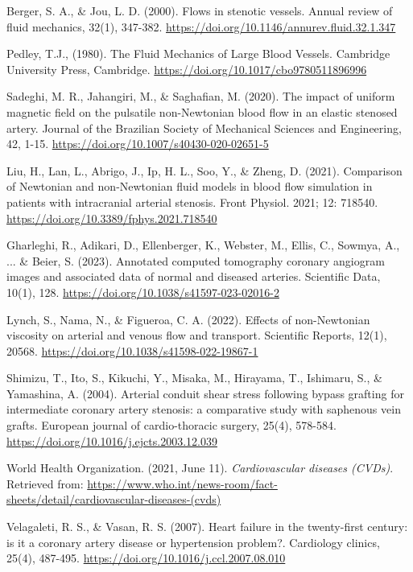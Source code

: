 ﻿\documentclass[12pt,a4paper]{article}
\theoremstyle{definition}
\numberwithin{equation}{section}
\begin{document}
\begin{thebibliography}{}
 Berger, S. A., \& Jou, L. D. (2000). Flows in stenotic vessels. Annual review of fluid mechanics, 32(1), 347-382.  \url{https://doi.org/10.1146/annurev.fluid.32.1.347}

 Pedley, T.J., (1980). The Fluid Mechanics of Large Blood Vessels. Cambridge University Press, Cambridge. \url{https://doi.org/10.1017/cbo9780511896996}

 Sadeghi, M. R., Jahangiri, M., \& Saghafian, M. (2020). The impact of uniform magnetic field on the pulsatile non-Newtonian blood flow in an elastic stenosed artery. Journal of the Brazilian Society of Mechanical Sciences and Engineering, 42, 1-15. \url{https://doi.org/10.1007/s40430-020-02651-5}  

 Liu, H., Lan, L., Abrigo, J., Ip, H. L., Soo, Y., \& Zheng, D. (2021). Comparison of Newtonian and non-Newtonian fluid models in blood flow simulation in patients with intracranial arterial stenosis. Front Physiol. 2021; 12: 718540. \url{https://doi.org/10.3389/fphys.2021.718540}

 Gharleghi, R., Adikari, D., Ellenberger, K., Webster, M., Ellis, C., Sowmya, A., ... \& Beier, S. (2023). Annotated computed tomography coronary angiogram images and associated data of normal and diseased arteries. Scientific Data, 10(1), 128. \url{https://doi.org/10.1038/s41597-023-02016-2}

 Lynch, S., Nama, N., \& Figueroa, C. A. (2022). Effects of non-Newtonian viscosity on arterial and venous flow and transport. Scientific Reports, 12(1), 20568. \url{https://doi.org/10.1038/s41598-022-19867-1}

 Shimizu, T., Ito, S., Kikuchi, Y., Misaka, M., Hirayama, T., Ishimaru, S., \& Yamashina, A. (2004). Arterial conduit shear stress following bypass grafting for intermediate coronary artery stenosis: a comparative study with saphenous vein grafts. European journal of cardio-thoracic surgery, 25(4), 578-584. \url{https://doi.org/10.1016/j.ejcts.2003.12.039}

 World Health Organization. (2021, June 11). \textit{Cardiovascular diseases (CVDs)}. Retrieved from: \url{https://www.who.int/news-room/fact-sheets/detail/cardiovascular-diseases-(cvds)}

 Velagaleti, R. S., \& Vasan, R. S. (2007). Heart failure in the twenty-first century: is it a coronary artery disease or hypertension problem?. Cardiology clinics, 25(4), 487-495. \url{https://doi.org/10.1016/j.ccl.2007.08.010}


\end{thebibliography}
\end{document}
